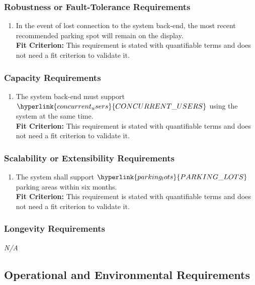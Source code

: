\documentclass[12pt,letterpaper]{article}
\begin{document}
\subsubsection{Robustness or Fault-Tolerance Requirements}
\begin{enumerate}[resume*] 
    \item In the event of lost connection to the system back-end, the most
    recent recommended parking spot will remain on the display.\\
    \textbf{Fit Criterion:} This requirement is stated with quantifiable terms
    and does not need a fit criterion to validate it. 
\end{enumerate}

\subsubsection{Capacity Requirements}
\begin{enumerate}[resume*] 
    \item The system back-end must support
    $\hyperlink{concurrent_users}{CONCURRENT\_USERS}$ using the system at the
    same time.\\
    \textbf{Fit Criterion:} This requirement is stated with quantifiable terms
    and does not need a fit criterion to validate it. 
\end{enumerate}

\subsubsection{Scalability or Extensibility Requirements}
\begin{enumerate}[resume*] 
    \item The system shall support $\hyperlink{parking_lots}{PARKING\_LOTS}$
    parking areas within six months.\\
    \textbf{Fit Criterion:} This requirement is stated with quantifiable terms
    and does not need a fit criterion to validate it. 
\end{enumerate}

\subsubsection{Longevity Requirements}
\noindent \emph{N/A}

\subsection{Operational and Environmental Requirements}
\end{document}
